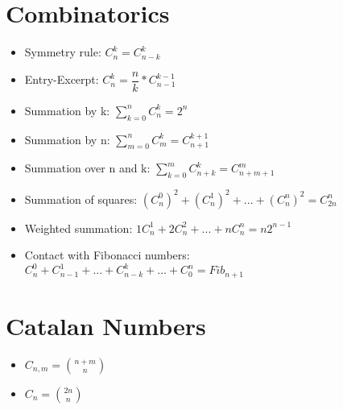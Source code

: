 \documentclass[10pt,a4paper]{report}
\begin{document}
	\section{Combinatorics}
		\begin{itemize}
			\item Symmetry rule:
			$C_{n}^{k} = C_{n-k}^{k}$
			\item Entry-Excerpt:
			$C_{n}^{k} = \dfrac{n}{k}*C_{n-1}^{k-1}$
			\item Summation by k:
			$\sum_{k=0}^{n}C_{n}^{k} = 2^{n}$
			\item Summation by n:
			$\sum_{m=0}^{n}C_{m}^{k} = C_{n+1}^{k+1}$
			\item Summation over n and k:
			$\sum_{k=0}^{m}C_{n+k}^{k} = C_{n+m+1}^{m}$
			\item Summation of squares:
			$(C_{n}^{0})^{2} + (C_{n}^{1})^{2} + ... + (C_{n}^{n})^{2} = C_{2n}^{n}$
			\item Weighted summation:
			$1C_{n}^{1} + 2C_{n}^{2} + ... + nC_{n}^{n} = n2^{n-1}$
			\item Contact with Fibonacci numbers:
			$C_{n}^{0} + C_{n-1}^{1} + ... + C_{n-k}^{k} + ... + C_{0}^{n} = Fib_{n+1}$
		\end{itemize}
	\newpage
	\section{Catalan Numbers}
	\begin{itemize}
		\item $C_{n, m} = \binom{n+m}{n}$
		\item $C_{n} = \binom{2n}{n}$
	\end{itemize}
\end{document}
